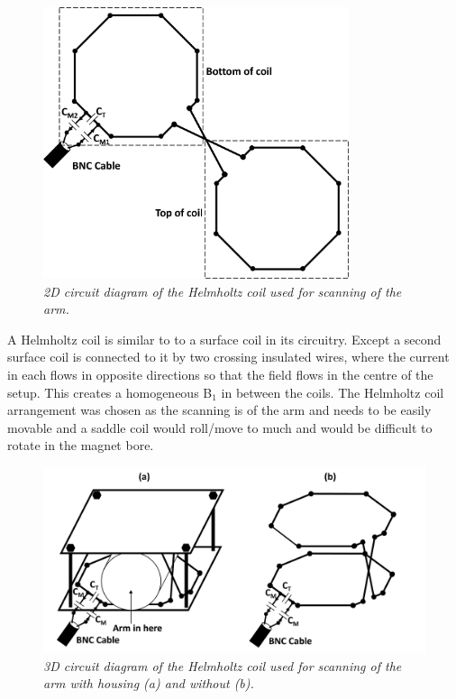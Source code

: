 \begin{figure}
    \centering
    \includegraphics[width=0.8\textwidth]{Figures/Theory/Planar_Helmholtz.png}
    \caption{\textit{2D circuit diagram of the Helmholtz coil used for scanning of the arm.}}
    \label{fig:theory:2D_Helmholtz}
\end{figure}

A Helmholtz coil is similar to to a surface coil in its circuitry. Except a second surface coil is connected to it by two crossing insulated wires, where the current in each flows in opposite directions so that the field flows in the centre of the setup. This creates a homogeneous B$_1$ in between the coils. The Helmholtz coil arrangement was chosen as the scanning is of the arm and needs to be easily movable and a saddle coil would roll/move to much and would be difficult to rotate in the magnet bore.

\begin{figure}
    \centering
    \includegraphics[width=1\textwidth]{Figures/Theory/3D_Helmholtz.png}
    \caption{\textit{3D circuit diagram of the Helmholtz coil used for scanning of the arm with housing (a) and without (b).}}
    \label{fig:theory:3D_Helmholtz}
\end{figure}

